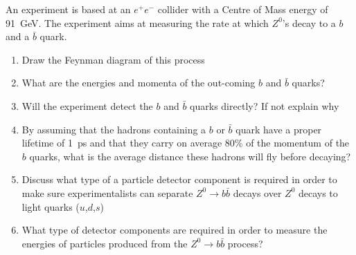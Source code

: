 An experiment is based at an $e^+e^-$ collider with a Centre of Mass energy of 91~GeV. The experiment aims at measuring the rate at which $Z^0$'s decay to a $b$ and a $\bar{b}$ quark.
\begin{enumerate}
\item Draw the Feynman diagram of this process
\item What are the energies and momenta of the out-coming $b$ and $\bar{b}$ quarks?
\item Will the experiment detect the $b$ and $\bar{b}$ quarks directly? If not explain why
\item By assuming that the hadrons containing a $b$ or $\bar{b}$ quark have a proper lifetime of 1~ps and that they carry on average 80\% of the momentum of the $b$ quarks, what is the average distance these hadrons will fly before decaying?
\item Discuss what type of a particle detector component is required in order to make sure experimentalists can separate $Z^0\to b\bar{b}$ decays over $Z^0$ decays to light quarks ($u$,$d$,$s$)
\item What type of detector components are required in order to measure the energies of particles produced from the $Z^0\to b\bar{b}$ process?
\end{enumerate}
